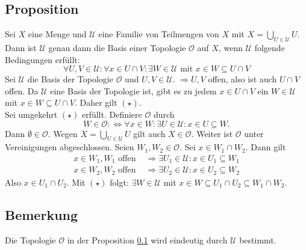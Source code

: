 \subsection[Proposition: Bedingung, dass eine Familie von Teilmengen eine Topologie ist]{Proposition} %
\label{sub:116}
Sei $X$ eine Menge und $\mathcal{U} $ eine Familie von Teilmengen von $X$ mit $X = \bigcup_{U \in \mathcal{U} } U$. Dann ist $\mathcal{U} $ genau dann die Basis einer Topologie 
$\mathcal{O}$ auf $X$, wenn $\mathcal{U} $ folgende Bedingungen erfüllt:
\[
	\forall U,V \in \mathcal{U} : \forall x \in U \cap V : \exists W \in \mathcal{U}  \text{ mit } x \in W \subseteq U \cap V \tag*{$(\star)$}
\]
Sei $\mathcal{U} $ die Basis der Topologie $\mathcal{O} $ und $U,V \in \mathcal{U} $. $\Rightarrow U,V$ offen, also ist auch $U \cap V$ offen. Da $\mathcal{U} $ eine Basis
der Topologie ist, gibt es zu jedem $x \in U \cap V$ ein $W \in \mathcal{U} $ mit $x \in W \subseteq U \cap V$. Daher gilt $(\star)$. \\
Sei umgekehrt $(\star)$ erfüllt. Definiere $\mathcal{O} $ durch
\[
	W \in \mathcal{O} :\Longleftrightarrow \forall x \in W : \exists U \in \mathcal{U} : x \in U \subseteq W.  
\]
Dann $\emptyset \in \mathcal{O} $. Wegen $X = \bigcup_{U \in \mathcal{U} } U$ gilt auch $X \in \mathcal{O} $. Weiter ist $\mathcal{O} $ unter Vereinigungen abgeschlossen.
Seien $W_1, W_2 \in \mathcal{O} $. Sei $x \in W_1 \cap W_2$. Dann gilt
\begin{align*}
	x \in W_1, W_1 \text{ offen } &\Rightarrow  \exists U_1 \in \mathcal{U} : x \in U_1 \subseteq W_1 \\
	x \in W_2, W_2 \text{ offen } &\Rightarrow \exists U_2 \in \mathcal{U} : x \in U_2 \subseteq W_2 
\end{align*}
Also $x \in U_1 \cap U_2$. Mit $(\star)$ folgt: $\exists W \in \mathcal{U} $ mit $x \in W \subseteq U_1 \cap U_2 \subseteq W_1 \cap W_2$. \bewende

\subsection[Bemerkung: Eindeutigkeit der Topologie in Proposition \ref{sub:116}]{Bemerkung} %
\label{sub:117}
Die Topologie $\mathcal{O}$ in der Proposition \ref{sub:116} wird eindeutig durch $\mathcal{U}$ bestimmt.

